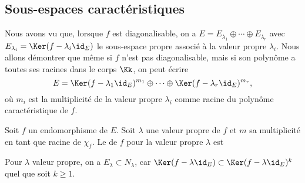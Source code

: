 \documentclass[12pt, class=report,crop=false]{standalone}
\begin{document}
\subsection{Sous-espaces caractéristiques}

Nous avons vu que, lorsque $f$ est diagonalisable, 
on a $E=E_{\lambda_1}\oplus\cdots\oplus E_{\lambda_r}$ avec 
$E_{\lambda_i}=\Ker(f-\lambda_i\id_E)$ le sous-espace propre associé 
à la valeur propre $\lambda_i$. Nous allons démontrer que même si $f$ 
n'est pas diagonalisable, mais si son polynôme a toutes ses racines dans 
le corps $\Kk$, on peut écrire
$$E=\Ker(f-\lambda_1\id_E)^{m_1}\oplus\cdots\oplus\Ker(f-\lambda_r\id_E)^{m_r},$$
où $m_i$ est la multiplicité de la valeur propre $\lambda_i$ comme 
racine du polynôme caractéristique de $f$.


\begin{definition}
Soit $f$ un endomorphisme de $E$. Soit $\lambda$ une valeur propre de $f$ et $m$ sa multiplicité
en tant que racine de $\chi_f$. Le  de $f$ pour la 
valeur propre $\lambda$ est 
\end{definition} 

Pour $\lambda$ valeur propre, on a $E_\lambda \subset N_\lambda$, car 
$\Ker(f-\lambda\id_E) \subset \Ker(f-\lambda\id_E)^{k}$ quel que soit $k \ge 1$.
\end{document}
